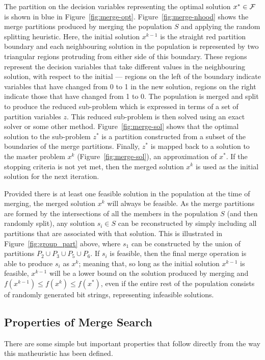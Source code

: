 \documentclass[journal]{IEEEtran}
\begin{document}
The partition on the decision variables representing the optimal solution $x^* \in {\cal F}$ is shown in blue in Figure~\ref{fig:merge-opt}. Figure~\ref{fig:merge-nhood} shows the merge partitions produced by merging the population $S$ and applying the random splitting heuristic. Here, the initial solution $x^{k-1}$ is the straight red partition boundary and each neighbouring solution in the population is represented by two triangular regions protruding from either side of this boundary. These regions represent the decision variables that take different values in the neighbouring solution, with respect to the initial --- regions on the left of the boundary indicate variables that have changed from 0 to 1 in the new solution, regions on the right indicate those that have changed from 1 to 0. The population is merged and split to produce the reduced sub-problem which is expressed in terms of a set of partition variables $z$. This reduced sub-problem is then solved using an exact solver or some other method. Figure~\ref{fig:merge-sol} shows that the optimal solution to the sub-problem $z^*$ is a partition constructed from a subset of the boundaries of the merge partitions. Finally, $z^*$ is mapped back to a solution to the master problem $x^k$ (Figure~\ref{fig:merge-sol}), an approximation of $x^*$. If the stopping criteria is not yet met, then the merged solution $x^k$ is used as the initial solution for the next iteration.

Provided there is at least one feasible solution in the population at the time of merging, the merged solution $x^k$ will always be feasible. As the merge partitions are formed by the intersections of all the members in the population $S$ (and then randomly split), any solution $s_i \in S$ can be reconstructed by simply including all partitions that are associated with that solution. This is illustrated in Figure~\ref{fig:group_part} above, where $s_1$ can be constructed by the union of partitions $P_2 \cup P_3 \cup P_5 \cup P_6$. If $s_i$ is feasible, then the final merge operation is able to produce $s_i$ as $x^k$; meaning that, so long as the initial solution $x^{k-1}$ is feasible, $x^{k-1}$ will be a lower bound on the solution produced by merging and $f(x^{k-1}) \leq f(x^k) \leq f(x^*)$, even if the entire rest of the population consists of randomly generated bit strings, representing infeasible solutions.


\subsection{Properties of Merge Search}
There are some simple but important properties that follow directly from the way this matheuristic has been defined.
\end{document}
